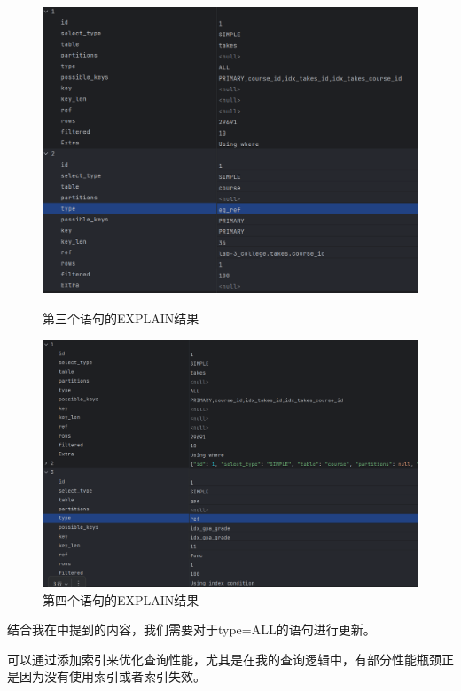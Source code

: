 \documentclass{article}
\begin{document}
	\begin{figure}[H]
		\centering
		\begin{minipage}[b]{0.45\textwidth}
			\includegraphics[width=\textwidth]{./images/14.EXPLAIN-3.png}
			\caption{第三个语句的EXPLAIN结果}
		\end{minipage}
		\hfill
		\begin{minipage}[b]{0.45\textwidth}
			\includegraphics[width=\textwidth]{./images/15.EXPLAIN-4.png}
			\caption{第四个语句的EXPLAIN结果}
		\end{minipage}
	\end{figure}
	
	结合我在中提到的内容，我们需要对于type=ALL的语句进行更新。
	
	可以通过添加索引来优化查询性能，尤其是在我的查询逻辑中，有部分性能瓶颈正是因为没有使用索引或者索引失效。
	
\end{document}
